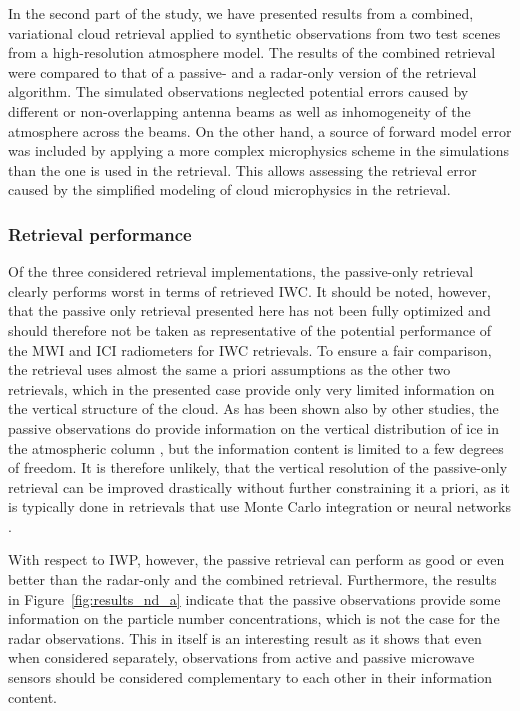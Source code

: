 \documentclass[journal abbreviation, manuscript]{copernicus}
\begin{document}
In the second part of the study, we have presented results from a combined,
variational cloud retrieval applied to synthetic observations from two test
scenes from a high-resolution atmosphere model. The results of the combined
retrieval were compared to that of a passive- and a radar-only version of the
retrieval algorithm. The simulated observations neglected potential errors
caused by different or non-overlapping antenna beams as well as inhomogeneity of
the atmosphere across the beams. On the other hand, a source of forward model
error was included by applying a more complex microphysics scheme in the
simulations than the one is used in the retrieval. This allows assessing the
retrieval error caused by the simplified modeling of cloud microphysics in the
retrieval.

\subsubsection{Retrieval performance}

Of the three considered retrieval implementations, the passive-only retrieval
clearly performs worst in terms of retrieved IWC. It should be noted, however,
that the passive only retrieval presented here has not been fully optimized and
should therefore not be taken as representative of the potential performance of
the MWI and ICI radiometers for IWC retrievals. To ensure a fair comparison, the
retrieval uses almost the same a priori assumptions as the other two retrievals,
which in the presented case provide only very limited information on the
vertical structure of the cloud. As has been shown also by other studies, the
passive observations do provide information on the vertical distribution of ice
in the atmospheric column \citep{wang17, grutzun18}, but the information content
is limited to a few degrees of freedom. It is therefore unlikely, that the
vertical resolution of the passive-only retrieval can be improved drastically
without further constraining it a priori, as it is typically done in retrievals
that use Monte Carlo integration or neural networks \citep{pfreundschuh18}.

With respect to IWP, however, the passive retrieval can perform as good or even
better than the radar-only and the combined retrieval. Furthermore, the results
in Figure~\ref{fig:results_nd_a} indicate that the passive observations provide
some information on the particle number concentrations, which is not the case
for the radar observations. This in itself is an interesting result as it shows
that even when considered separately, observations from active and passive
microwave sensors should be considered complementary to each other in their
information content.
\end{document}
